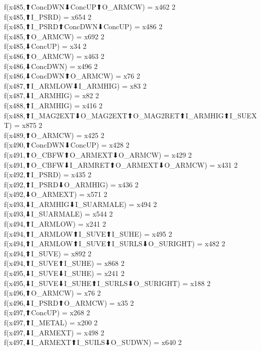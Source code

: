 f(x485,⬆ConcDWN⬇ConcUP⬆O_ARMCW) = x462 {2} \\
f(x485,⬆I_PSRD) = x654 {2} \\
f(x485,⬆I_PSRD⬆ConcDWN⬇ConcUP) = x486 {2} \\
f(x485,⬆O_ARMCW) = x692 {2} \\
f(x485,⬇ConcUP) = x34 {2} \\
f(x486,⬆O_ARMCW) = x463 {2} \\
f(x486,⬇ConcDWN) = x496 {2} \\
f(x486,⬇ConcDWN⬆O_ARMCW) = x76 {2} \\
f(x487,⬆I_ARMLOW⬇I_ARMHIG) = x83 {2} \\
f(x487,⬇I_ARMHIG) = x82 {2} \\
f(x488,⬆I_ARMHIG) = x416 {2} \\
f(x488,⬆I_MAG2EXT⬇O_MAG2EXT⬆O_MAG2RET⬆I_ARMHIG⬆I_SUEXT) = x875 {2} \\
f(x489,⬆O_ARMCW) = x425 {2} \\
f(x490,⬆ConcDWN⬇ConcUP) = x428 {2} \\
f(x491,⬆O_CBFW⬆O_ARMEXT⬇O_ARMCW) = x429 {2} \\
f(x491,⬆O_CBFW⬇I_ARMRET⬆O_ARMEXT⬇O_ARMCW) = x431 {2} \\
f(x492,⬆I_PSRD) = x435 {2} \\
f(x492,⬆I_PSRD⬇O_ARMHIG) = x436 {2} \\
f(x492,⬇O_ARMEXT) = x571 {2} \\
f(x493,⬇I_ARMHIG⬇I_SUARMALE) = x494 {2} \\
f(x493,⬇I_SUARMALE) = x544 {2} \\
f(x494,⬆I_ARMLOW) = x241 {2} \\
f(x494,⬆I_ARMLOW⬆I_SUVE⬆I_SUHE) = x495 {2} \\
f(x494,⬆I_ARMLOW⬆I_SUVE⬆I_SURLS⬇O_SURIGHT) = x482 {2} \\
f(x494,⬆I_SUVE) = x892 {2} \\
f(x494,⬆I_SUVE⬆I_SUHE) = x868 {2} \\
f(x495,⬇I_SUVE⬇I_SUHE) = x241 {2} \\
f(x495,⬇I_SUVE⬇I_SUHE⬆I_SURLS⬇O_SURIGHT) = x188 {2} \\
f(x496,⬆O_ARMCW) = x76 {2} \\
f(x496,⬇I_PSRD⬆O_ARMCW) = x35 {2} \\
f(x497,⬆ConcUP) = x268 {2} \\
f(x497,⬆I_METAL) = x200 {2} \\
f(x497,⬇I_ARMEXT) = x498 {2} \\
f(x497,⬇I_ARMEXT⬆I_SUILS⬇O_SUDWN) = x640 {2} \\
